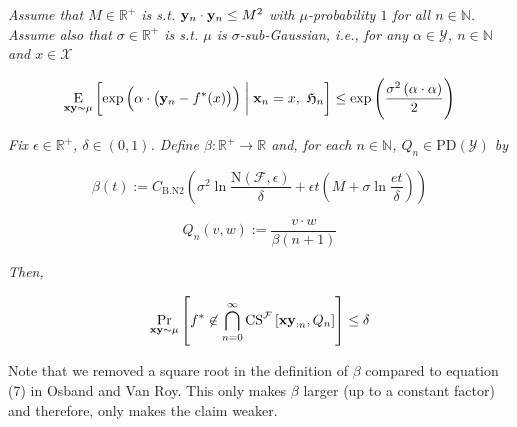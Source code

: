 \documentclass[a4paper]{article}
\newcommand{\Co}[1]{}
\newcommand{\AP}[1]{\left(#1\right)}
\newcommand{\AB}[1]{\left[#1\right]}
\newcommand{\ABM}[2]{\left[#1\;\middle\vert\;#2\right]}
\newcommand{\Pa}[2]{\underset{#1}{\operatorname{Pr}}\AB{#2}}
\newcommand{\CE}[3]{\underset{#1}{\operatorname{E}}\ABM{#2}{#3}}
\newcommand{\Nats}{\mathbb{N}}
\newcommand{\Reals}{\mathbb{R}}
\newcommand{\PD}{\mathrm{PD}}
\newcommand{\X}{\mathcal{X}}
\newcommand{\Y}{\mathcal{Y}}
\newcommand{\F}{\mathcal{F}}
\newcommand{\N}{\mathrm{N}}
\newcommand{\CS}{\mathrm{CS}}
\begin{document}
\textit{Assume that $M\in\Reals^+$ is s.t. $\bold{y}_n\cdot\bold{y}_n\leq M^2$ with $\mu$-probability $1$ for all $n\in\Nats$. Assume also that $\sigma\in\Reals^+$ is s.t. $\mu$ is $\sigma$-sub-Gaussian, i.e., for any $\alpha\in\Y$, $n\in\Nats$ and $x\in\X$}\Co{i}

$$\CE{\bold{xy}\sim\mu}{\exp\AP{\alpha\cdot\AP{\bold{y}_n-f^*(x)}}}{\bold{x}_n=x,\ \mathfrak{H}_n} \leq \exp\AP{\frac{\sigma^2\AP{\alpha\cdot\alpha}}{2}}$$

\textit{Fix $\epsilon\in\Reals^+$, $\delta\in(0,1)$. Define $\beta:\Reals^+\rightarrow\Reals$ and, for each $n\in\Nats$, $Q_n\in\PD(\Y)$ by}\Co{i}

$$\beta(t):=C_{\mathrm{B.N2}}\AP{\sigma^2 \ln{\frac{\N(\F,\epsilon)}{\delta}}+\epsilon t\AP{M+\sigma\ln{\frac{et}{\delta}}}}$$

$$Q_n(v,w):=\frac{v\cdot w}{\beta(n+1)}$$

\textit{Then,}\Co{i}

$$\Pa{\bold{xy}\sim\mu}{f^*\not\in\bigcap_{n=0}^\infty\CS^\F\AB{\bold{xy}_{:n},Q_n}} \leq \delta$$

Note that we removed a square root in the definition of $\beta$ compared to equation (7) in Osband and Van Roy. This only makes $\beta$ larger (up to a constant factor) and therefore, only makes the claim weaker.
\end{document}
